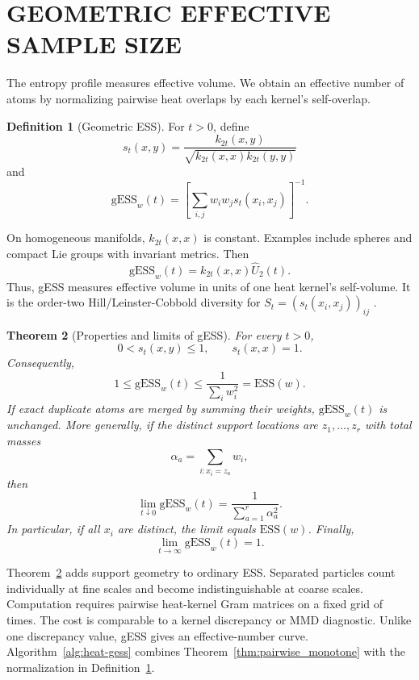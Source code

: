 \documentclass[twoside]{article}
\newtheorem{theorem}{Theorem}
\theoremstyle{definition}
\newtheorem{definition}[theorem]{Definition}
\theoremstyle{remark}
\newcommand{\ess}{\mathrm{ESS}}
\newcommand{\gess}{\mathrm{gESS}}
\begin{document}
\section{GEOMETRIC EFFECTIVE SAMPLE SIZE}\label{sec:gess}

The entropy profile measures effective volume. We obtain an effective number of atoms by normalizing pairwise heat overlaps by each kernel's self-overlap.

\begin{definition}[Geometric ESS]
\label{def:gess}
For $t>0$, define
\[
  s_t(x,y)=\frac{k_{2t}(x,y)}{\sqrt{k_{2t}(x,x)k_{2t}(y,y)}}
\]
and
\[
  \gess_w(t)=\left[\sum_{i,j}w_iw_js_t(x_i,x_j)\right]^{-1}.
\]
\end{definition}

On homogeneous manifolds, $k_{2t}(x,x)$ is constant. Examples include spheres and compact Lie groups with invariant metrics. Then
\[
  \gess_w(t)=k_{2t}(x,x)\widehat U_2(t).
\]
Thus, gESS measures effective volume in units of one heat kernel's self-volume. It is the order-two Hill/Leinster-Cobbold diversity for
$S_t=(s_t(x_i,x_j))_{ij}$ \citep{hill_1973_DiversityEvennessUnifying, leinster_2012_MeasuringDiversityImportance}.

\begin{theorem}[Properties and limits of gESS]
\label{thm:gess}
For every $t>0$,
\[
  0<s_t(x,y)\le1,
  \qquad
  s_t(x,x)=1.
\]
Consequently,
\[
  1\le \gess_w(t)\le \frac{1}{\sum_iw_i^2}=\ess(w).
\]
If exact duplicate atoms are merged by summing their weights, $\gess_w(t)$ is
unchanged. More generally, if the distinct support locations are
$z_1,\ldots,z_r$ with total masses
\[
  \alpha_a=\sum_{i:x_i=z_a}w_i,
\]
then
\[
  \lim_{t\downarrow0}\gess_w(t)=\frac{1}{\sum_{a=1}^r\alpha_a^2}.
\]
In particular, if all $x_i$ are distinct, the limit equals $\ess(w)$. Finally,
\[
  \lim_{t\to\infty}\gess_w(t)=1.
\]
\end{theorem}

Theorem~\ref{thm:gess} adds support geometry to ordinary ESS. Separated particles count individually at fine scales and become indistinguishable at coarse scales. Computation requires pairwise heat-kernel Gram matrices on a fixed grid of times. The cost is comparable to a kernel discrepancy or MMD diagnostic. Unlike one discrepancy value, gESS gives an effective-number curve. Algorithm~\ref{alg:heat-gess} combines Theorem~\ref{thm:pairwise_monotone} with the normalization in Definition~\ref{def:gess}.
\end{document}
